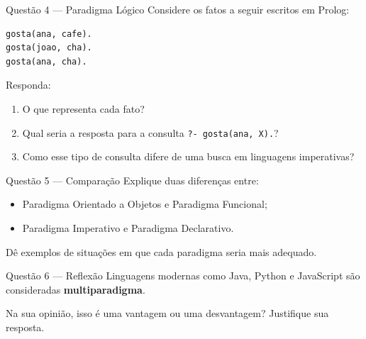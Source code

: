 \documentclass[12pt]{article}
\begin{document}
\begin{block}{Questão 4 — Paradigma Lógico}
Considere os fatos a seguir escritos em Prolog:

\begin{verbatim}
gosta(ana, cafe).
gosta(joao, cha).
gosta(ana, cha).
\end{verbatim}

Responda:
\begin{enumerate}
  \item O que representa cada fato?
  \item Qual seria a resposta para a consulta \texttt{?- gosta(ana, X).}?
  \item Como esse tipo de consulta difere de uma busca em linguagens imperativas?
\end{enumerate}
\end{block}

\begin{block}{Questão 5 — Comparação}
Explique duas diferenças entre:
\begin{itemize}
  \item Paradigma Orientado a Objetos e Paradigma Funcional;
  \item Paradigma Imperativo e Paradigma Declarativo.
\end{itemize}

Dê exemplos de situações em que cada paradigma seria mais adequado.
\end{block}

\begin{block}{Questão 6 — Reflexão}
Linguagens modernas como Java, Python e JavaScript são consideradas
\textbf{multiparadigma}.

Na sua opinião, isso é uma vantagem ou uma desvantagem?
Justifique sua resposta.
\end{block}

\end{document}
